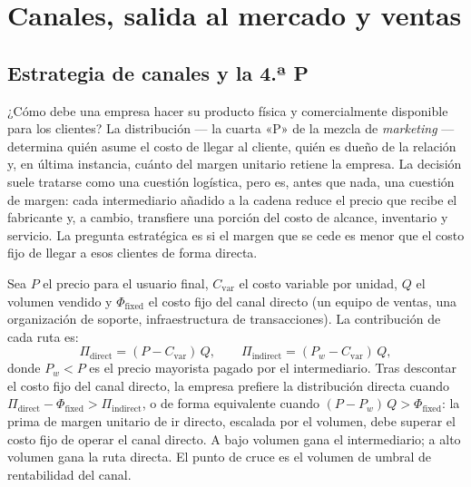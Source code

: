 \chapter{Canales, salida al mercado y ventas}\label{ch:channels-gtm-and-sales}


\section{Estrategia de canales y la 4.ª P}\label{sec:channel-strategy}

¿Cómo debe una empresa hacer su producto física y comercialmente disponible para los clientes?
La distribución --- la cuarta «P» de la mezcla de \emph{marketing} --- determina quién asume el
costo de llegar al cliente, quién es dueño de la relación y, en última instancia, cuánto del
margen unitario retiene la empresa. La decisión suele tratarse como una cuestión logística, pero
es, antes que nada, una cuestión de margen: cada intermediario añadido a la cadena reduce el
precio que recibe el fabricante y, a cambio, transfiere una porción del costo de alcance,
inventario y servicio. La pregunta estratégica es si el margen que se cede es menor que el
costo fijo de llegar a esos clientes de forma directa.

Sea \(P\) el precio para el usuario final, \(C_{\text{var}}\) el costo variable por unidad, \(Q\) el
volumen vendido y \(\Phi_{\text{fixed}}\) el costo fijo del canal directo (un equipo de ventas,
una organización de soporte, infraestructura de transacciones). La contribución de cada ruta es:
\begin{equation}\label{eq:channel-margin}
  \Pi_{\text{direct}}   = (P - C_{\text{var}})\,Q, \qquad
  \Pi_{\text{indirect}} = (P_w - C_{\text{var}})\,Q,
\end{equation}
donde \(P_w < P\) es el precio mayorista pagado por el intermediario. Tras descontar el costo fijo
del canal directo, la empresa prefiere la distribución directa cuando
\(\Pi_{\text{direct}} - \Phi_{\text{fixed}} > \Pi_{\text{indirect}}\), o de forma equivalente cuando
\((P - P_w)\,Q > \Phi_{\text{fixed}}\): la prima de margen unitario de ir directo, escalada por
el volumen, debe superar el costo fijo de operar el canal directo. A bajo volumen gana el
intermediario; a alto volumen gana la ruta directa. El punto de cruce es el volumen de umbral de
rentabilidad del canal.

